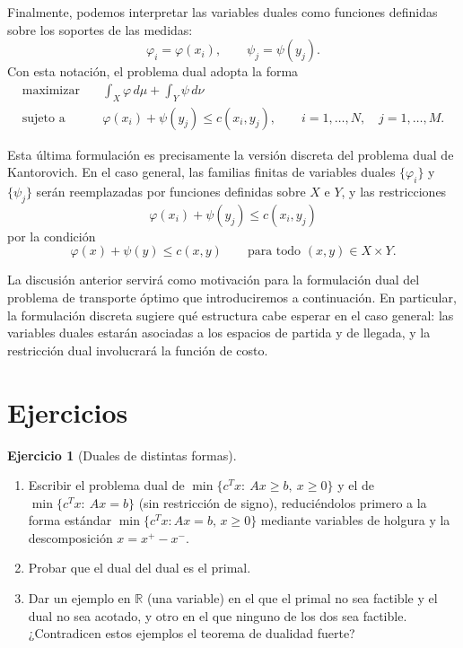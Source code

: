 \documentclass[12pt, a4paper]{amsbook}
\newcommand{\R}{{\mathbb R}}
\theoremstyle{remark}
\theoremstyle{definition}
\newtheorem{ejercicio}{Ejercicio}[chapter]
\numberwithin{section}{chapter}
\numberwithin{subsection}{section}
\numberwithin{equation}{section}
\numberwithin{figure}{chapter}
\begin{document}
Finalmente, podemos interpretar las variables duales como funciones
definidas sobre los soportes de las medidas:
\[
\varphi_i=\varphi(x_i),
\qquad
\psi_j=\psi(y_j).
\]
Con esta notación, el problema dual adopta la forma
\[
\begin{aligned}
\text{maximizar}\quad&
\int_X\varphi\,d\mu+\int_Y\psi\,d\nu\\
\text{sujeto a}\quad&
\varphi(x_i)+\psi(y_j)\leq c(x_i,y_j),
\qquad
i=1,\ldots,N,\quad j=1,\ldots,M.
\end{aligned}
\]

Esta última formulación es precisamente la versión discreta del problema
dual de Kantorovich. En el caso general, las familias finitas de variables
duales $\{\varphi_i\}$ y $\{\psi_j\}$ serán reemplazadas por funciones
definidas sobre $X$ e $Y$, y las restricciones
\[
\varphi(x_i)+\psi(y_j)\leq c(x_i,y_j)
\]
por la condición
\[
\varphi(x)+\psi(y)\leq c(x,y)
\qquad\text{para todo }(x,y)\in X\times Y.
\]

La discusión anterior servirá como motivación para la formulación dual del
problema de transporte óptimo que introduciremos a continuación. En
particular, la formulación discreta sugiere qué estructura cabe esperar en
el caso general: las variables duales estarán asociadas a los espacios de
partida y de llegada, y la restricción dual involucrará la función de costo.


\section*{Ejercicios}

\begin{ejercicio}[Duales de distintas formas]\label{ejer.PL.formas}
\leavevmode
\begin{enumerate}[label=(\alph*)]
\item Escribir el problema dual de $\min\{c^Tx:\ Ax\ge b,\ x\ge0\}$ y el de
$\min\{c^Tx:\ Ax=b\}$ (sin restricción de signo), reduciéndolos primero a la
forma estándar $\min\{c^Tx:Ax=b,\,x\ge0\}$ mediante variables de holgura y
la descomposición $x=x^+-x^-$.
\item Probar que el dual del dual es el primal.
\item Dar un ejemplo en $\R$ (una variable) en el que el primal no sea
factible y el dual no sea acotado, y otro en el que ninguno de los dos sea
factible. ¿Contradicen estos ejemplos el teorema de dualidad fuerte?
\end{enumerate}
\end{ejercicio}
\end{document}
